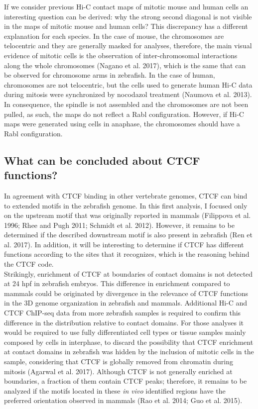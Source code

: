 If we consider previous Hi-C contact maps of mitotic mouse and human cells an interesting question can be derived: why the strong second diagonal is not visible in the maps of mitotic mouse and human cells? This discrepancy has a different explanation for each species. In the case of mouse, the chromosomes are telocentric and they are generally masked for analyses, therefore, the main visual evidence of mitotic cells is the observation of inter-chromosomal interactions along the whole chromosomes (Nagano et al. 2017), which is the same that can be observed for chromosome arms in zebrafish. In the case of human, chromosomes are not telocentric, but the cells used to generate human Hi-C data during mitosis were synchronized by nocodazol treatment (Naumova et al. 2013). In consequence, the spindle is not assembled and the chromosomes are not been pulled, as such, the maps do not reflect a Rabl configuration. However, if Hi-C maps were generated using cells in anaphase, the chromosomes should have a Rabl configuration.\\

		\subsection{What can be concluded about CTCF functions?}

In agreement with CTCF binding in other vertebrate genomes, CTCF can bind to extended motifs in the zebrafish genome. In this first analysis, I focused only on the upstream motif that was originally reported in mammals (Filippova et al. 1996; Rhee and Pugh 2011; Schmidt et al. 2012). However, it remains to be determined if the described downstream motif is also present in zebrafish (Ren et al. 2017). In addition, it will be interesting to determine if CTCF has different functions according to the sites that it recognizes, which is the reasoning behind the CTCF code.\\

Strikingly, enrichment of CTCF at boundaries of contact domains is not detected at 24 hpf in zebrafish embryos. This difference in enrichment compared to mammals could be originated by divergence in the relevance of CTCF functions in the 3D genome organization in zebrafish and mammals. Additional Hi-C and CTCF ChIP-seq data from more zebrafish samples is required to confirm this difference in the distribution relative to contact domains. For those analyses it would be required to use fully differentiated cell types or tissue samples mainly composed by cells in interphase, to discard the possibility that CTCF enrichment at contact domains in zebrafish was hidden by the inclusion of mitotic cells in the sample, considering that CTCF is globally removed from chromatin during mitosis (Agarwal et al. 2017). Although CTCF is not generally enriched at boundaries, a fraction of them contain CTCF peaks; therefore, it remains to be analyzed if the motifs located in these \textit{in vivo} identified regions have the preferred orientation observed in mammals (Rao et al. 2014; Guo et al. 2015).\\

